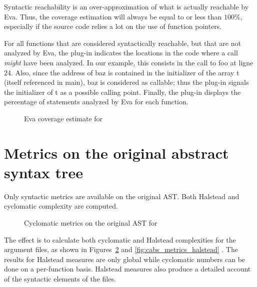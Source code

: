 \documentclass{frama-c-book}
\begin{document}
\begin{shell}[escapechar={\#}]
\end{shell}

Syntactic reachability is an over-approximation of what is actually
reachable by Eva. Thus, the coverage estimation will
always be equal to or less than $100\%$, especially if the source
code relies a lot on the use of function pointers.

For all functions that are considered syntactically reachable, but that
are not analyzed by Eva, the plug-in indicates the
locations in the code where a call \emph{might} have been analyzed.
In our example, this consists in the call to {\sf foo} at ligne 24.
Also, since the address of {\sf baz} is contained in
the initializer of the array {\sf t} (itself referenced in {\sf main}),
{\sf baz} is considered as callable; thus the plug-in signals the
initializer of {\sf t} as a possible calling point.
%
Finally, the plug-in displays the percentage of statements analyzed by Eva
for each function.

\begin{figure}[!ht]
  \centering
    
  \caption{Eva coverage estimate for \pgname}
  \label{fig:value-cover}
\end{figure}


\section{Metrics on the original abstract syntax tree}
\label{sec:metrics-original-ast}

Only syntactic metrics are available on the original AST. Both Halstead and
cyclomatic complexity are computed.

\begin{shell}[escapechar={\#}]
\end{shell}

\begin{figure}
  \centering
  
  \caption{Cyclomatic metrics on the original AST for \pgname}
  \label{fig:cabs_metrics_cyclo}
\end{figure}

The effect is to calculate both cyclomatic and Halstead complexities for the
argument files, as shown in Figures~\ref{fig:cabs_metrics_cyclo} and
\ref{fig:cabs_metrics_halstead} . The results for
Halstead measures are only global while cyclomatic numbers can be done on a
per-function basis. Halstead measures also produce a detailed account
of the syntactic elements of the files.
\end{document}
